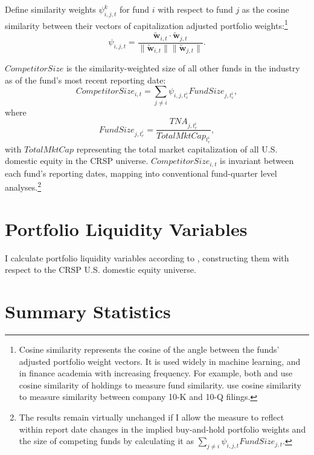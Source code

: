 \documentclass[]{book}
\let\rmarkdownfootnote\footnote%
\def\footnote{\protect\rmarkdownfootnote}
\theoremstyle{definition}
\theoremstyle{definition}
\theoremstyle{definition}
\theoremstyle{remark}
\begin{document}
Define similarity weights \(\psi_{i,j,t}^k\) for fund \(i\) with respect
to fund \(j\) as the cosine similarity between their vectors of
capitalization adjusted portfolio weights:\footnote{Cosine similarity
  represents the cosine of the angle between the funds' adjusted
  portfolio weight vectors. It is used widely in machine learning, and
  in finance academia with increasing frequency. For example, both
  \citet{blocher16} and \citet{hkp17} use cosine similarity of holdings
  to measure fund similarity. \citet{lmn16} use cosine similarity to
  measure similarity between company 10-K and 10-Q filings.}
\begin{equation}
\psi_{i,j,t} = \frac{ \mathbf{\tilde{w}}_{i,t} \cdot \mathbf{\tilde{w}}_{j,t} }{ \| \mathbf{\tilde{w}}_{i,t} \|  \| \mathbf{\tilde{w}}_{j,t} \| }.
\end{equation}

\(CompetitorSize\) is the similarity-weighted size of all other funds in
the industry as of the fund's most recent reporting date:
\begin{equation}
CompetitorSize_{i,t} = \sum_{j\neq i} \psi_{i,j,t^i_r} FundSize_{j,t^i_r},
\end{equation} where \begin{equation}
FundSize_{j,t^i_r}=\frac{TNA_{j,t^i_r}}{TotalMktCap_{t^i_r}},
\end{equation} with \(TotalMktCap\) representing the total market
capitalization of all U.S. domestic equity in the CRSP universe.
\(CompetitorSize_{i,t}\) is invariant between each fund's reporting
dates, mapping into conventional fund-quarter level analyses.\footnote{The
  results remain virtually unchanged if I allow the measure to reflect
  within report date changes in the implied buy-and-hold portfolio
  weights and the size of competing funds by calculating it as
  \(\sum_{j\neq i}\psi_{i,j,t} FundSize_{j,t}\).}

\hypertarget{portfolio-liquidity-variables}{%
\section{Portfolio Liquidity
Variables}\label{portfolio-liquidity-variables}}

I calculate portfolio liquidity variables according to \citet{pst17L},
constructing them with respect to the CRSP U.S. domestic equity
universe.

\hypertarget{sec:sumStats}{%
\section{Summary Statistics}\label{sec:sumStats}}
\end{document}
